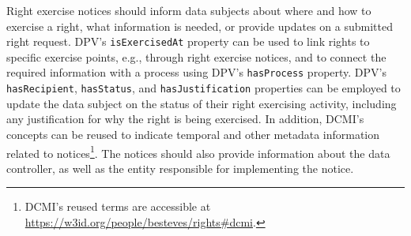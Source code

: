 \documentclass{IOS-Book-Article}     %
\begin{document}
Right exercise notices should inform data subjects about where and how to exercise a right, what information is needed, or provide updates on a submitted right request.
DPV’s \texttt{isExercisedAt} property can be used to link rights to specific exercise points, e.g., through right exercise notices, and to connect the required information with a process using DPV’s \texttt{hasProcess} property.
DPV's \texttt{hasRecipient}, \texttt{hasStatus}, and \texttt{hasJustification} properties can be employed to update the data subject on the status of their right exercising activity, including any justification for why the right is being exercised.
In addition, DCMI's concepts can be reused to indicate temporal and other metadata information related to notices\footnote{DCMI's reused terms are accessible at \url{https://w3id.org/people/besteves/rights\#dcmi}.}.
The notices should also provide information about the data controller, as well as the entity responsible for implementing the notice.

\end{document}
